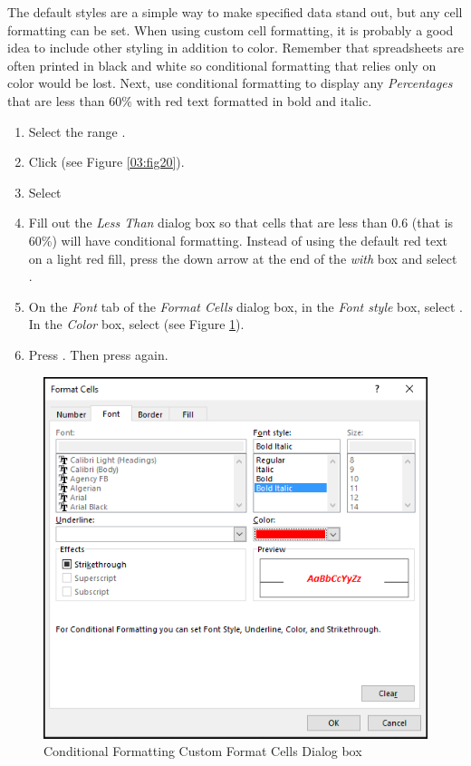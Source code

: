 The default styles are a simple way to make specified data stand out, but any cell formatting can be set. When using custom cell formatting, it is probably a good idea to include other styling in addition to color. Remember that spreadsheets are often printed in black and white so conditional formatting that relies only on color would be lost. Next, use conditional formatting to display any \textit{Percentages} that are less than $ 60\% $ with red text formatted in bold and italic.

\begin{enumbox}
	\begin{enumerate}
		\item Select the range .
		\item Click  (see Figure \ref{03:fig20}).
		\item Select 
		\item Fill out the \textit{Less Than} dialog box so that cells that are less than $ 0.6 $ (that is 60\%) will have conditional formatting. Instead of using the default red text on a light red fill, press the down arrow at the end of the \textit{with} box and select .
		\item On the \textit{Font} tab of the \textit{Format Cells} dialog box, in the \textit{Font style} box, select . In the \textit{Color} box, select  (see Figure \ref{03:fig22}).
		\item Press . Then press  again.
	\end{enumerate}
\end{enumbox}
	
\begin{figure}[H]
	\centering
	\includegraphics[width=\maxwidth{.95\linewidth}]{gfx/ch03_fig22}
	\caption{Conditional Formatting Custom Format Cells Dialog box}
	\label{03:fig22}
\end{figure}

